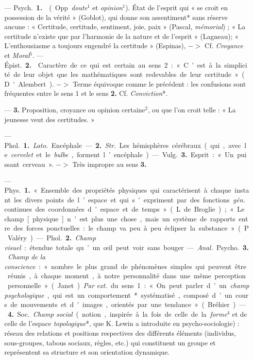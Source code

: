 \begin{itemize}[leftmargin=1cm, label=, itemsep=11pt]
 —  \si{Psych.} {\bf 1.}  (Opp.
{\it doute}$^1$ et {\it opinion}$^1$). État de l’esprit
qui « se croit en possession de la
vérité » (Goblot), qui donne son
assentiment* sans réserve aucune :
« Certitude, certitude, sentiment,
joie, paix » (Pascal, {\it mémorial}) ; « La
certitude n'existe que par l’harmonie de la nature et de l'esprit »
(Lagneau); « L’enthousiasme a toujours engendré la certitude » (Espinas), $->$ Cf. {\it Croyance} et {\it Moral}$^5$.
— \si{Épist.} {\bf 2.}  Caractère de ce qui
est certain au sens 2 : « C’est à la
simplicité de leur objet que les mathématiques sont redevables de leur
certitude » (D'Alembert). $->$ Terme
équivoque comme le précédent : les
confusions sont fréquentes entre le
sens 1 et le sens {\bf 2.} Cf. {\it Conviction}*.

—  {\bf 3.} Proposition, croyance
ou opinion certaine$^2$, ou que l’on
croit telle : « La jeunesse veut des
certitudes. »

 — \si{Phol.} {\bf 1.}  {\it Lato.} Encéphale.
— {\bf 2.}  {\it Str.} Les hémisphères cérébraux
(qui, avec le {\it cervelet} et le {\it bulbe}, forment l’encéphale).

— \si{Vulg.} {\bf 3.} Esprit : « Un puissant cerveau ». $->$ Très impropre
au sens {\bf 3.}


 — \si{Phys.} {\bf 1.} « Ensemble des
propriétés physiques qui caractérisent à chaque instant les divers
points de l’espace et qui s'expriment
par des fonctions  {\it gén.} continues des
coordonnées d’espace et de temps »
(L. de Broglie); « Le champ [physique] n’est plus une chose, mais un
système de rapports entre des forces
ponctuelles : le champ va peu à peu
éclipser la substance » (P. Valéry).
— \si{Phol.} {\bf 2.} {\it Champ visuel} : étendue totale qu’un œil peut voir sans bouger.

— {\it Anal.} \si{Psycho.} {\bf 3.} {\it Champ de la
conscience} : « nombre le plus grand
de phénomènes simples qui peuvent
être réunis, à chaque moment, à
notre personnalité dans une même
perception personnelle » (Janet).
{\it Par ext.} du sens 1 : « On peut parler
d’un {\it champ psychologique}, qui est
un comportement* systématisé,
composé d’un cours de mouvements
et d'images, orientés par une tendance » (Bréhier). — {\bf 4.} \si{Soc.} {\it Champ
social} (notion, inspirée à la fois de
celle de la {\it forme}$^4$ et de celle de
l’espace {\it topologique}*, que K. Lewin
a introduite en psycho-sociologie) :
réseau des relations et positions respectives des différents éléments
(individus, sous-groupes, tabous sociaux, règles, etc.) qui constituent
un groupe et représentent sa structure et son orientation dynamique.


\end{itemize}

